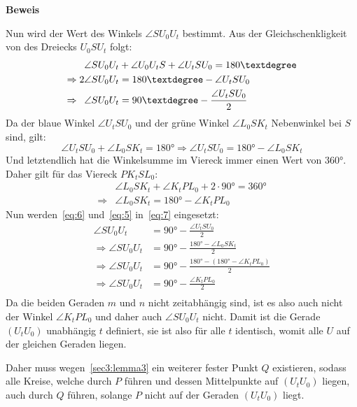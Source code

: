 \documentclass[10pt, a4paper, reqno]{amsart}
\makeatletter
\renewcommand\proofname{Beweis}
\renewenvironment{proof}[1][\proofname]{\par
\pushQED{\qed}%
\normalfont \topsep6\p@\@plus6\p@\relax
\trivlist
\item\relax
{\bfseries#1}\hspace\labelsep\ignorespaces
}{%
\popQED\endtrivlist\@endpefalse
}
\makeatother
\begin{document}
\begin{proof}
  Nun wird der Wert des Winkels $\angle SU_0U_t$ bestimmt. Aus der
  Gleichschenkligkeit von des Dreiecks $U_0SU_t$ folgt:
  \begin{equation}
    \label{eq:7}
    \begin{split}
      \angle SU_0U_t& +\angle U_0U_tS + \angle U_tSU_0 = 180°\\
      \Rightarrow2\angle SU_0U_t&= 180° - \angle U_tSU_0\\
      \Rightarrow\hphantom{2}\angle SU_0U_t&= 90° - \frac{\angle U_tSU_0}{2}
    \end{split}
  \end{equation}
  Da der blaue Winkel $\angle U_tSU_0$ und der grüne Winkel $\angle L_0SK_t$
  Nebenwinkel bei $S$ sind, gilt:
  \begin{equation}
    \label{eq:5}
    \angle U_tSU_0 + \angle L_0SK_t = 180° \Rightarrow \angle U_tSU_0 = 180° - \angle L_0SK_t
  \end{equation}
  Und letztendlich hat die Winkelsumme im Viereck immer einen Wert von $360°$.
  Daher gilt für das Viereck $PK_tSL_0$:
  \begin{equation}
    \label{eq:6}
    \begin{split}
      &\angle L_0SK_t + \angle K_tPL_0 + 2\cdot 90° = 360°\\
      \Rightarrow &\angle L_0SK_t= 180° - \angle K_tPL_0
    \end{split}
  \end{equation}
  Nun werden~\eqref{eq:6} und~\eqref{eq:5} in~\eqref{eq:7} eingesetzt:
\begin{align*}
    \angle SU_0U_t &= 90° -\frac{\angle U_tSU_0}{2}\\
    \Rightarrow \angle SU_0U_t &= 90° -\frac{180°-\angle L_0SK_t}{2}\\
    \Rightarrow \angle SU_0U_t &= 90° -\frac{180°-(180° - \angle K_tPL_0)}{2}\\
    \Rightarrow \angle SU_0U_t &= 90° -\frac{\angle K_tPL_0}{2}\\
  \end{align*}
  Da die beiden Geraden $m$ und $n$ nicht zeitabhängig sind, ist es
  also auch nicht der Winkel $\angle K_tPL_0$ und daher auch $\angle SU_0U_t$ nicht.
  Damit ist die Gerade $(U_tU_0)$ unabhängig $t$ definiert, sie ist also für
  alle $t$ identisch, womit alle $U$ auf der gleichen Geraden liegen.
  
  Daher muss wegen~\autoref{sec3:lemma3} ein weiterer fester Punkt
  $Q$ existieren, sodass alle Kreise, welche durch $P$ führen und dessen
  Mittelpunkte auf $(U_tU_0)$ liegen, auch durch $Q$ führen, solange
  $P$ nicht auf der Geraden $(U_tU_0)$ liegt.


\end{proof}
\end{document}
